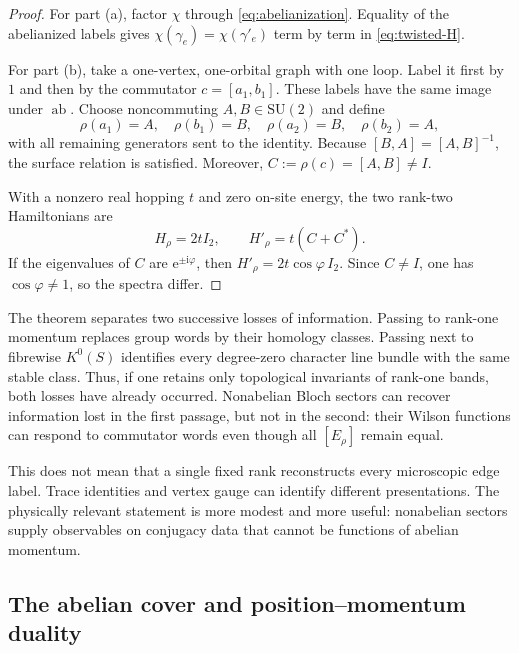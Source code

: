 \documentclass[11pt]{article}
\theoremstyle{definition}
\theoremstyle{remark}
\newcommand{\SU}{\mathrm{SU}}
\newcommand{\ii}{\mathrm i}
\newcommand{\e}{\mathrm e}
\begin{document}
\begin{proof}
For part \textup{(a)}, factor \(\chi\) through
\eqref{eq:abelianization}.  Equality of the abelianized labels gives
\(\chi(\gamma_e)=\chi(\gamma'_e)\) term by term in
\eqref{eq:twisted-H}.

For part \textup{(b)}, take a one-vertex, one-orbital graph with one loop.
Label it first by \(1\) and then by the commutator
\(c=[a_1,b_1]\).  These labels have the same image under
\(\operatorname{ab}\).  Choose noncommuting \(A,B\in\SU(2)\) and define
\[
 \rho(a_1)=A,\quad \rho(b_1)=B,\quad
 \rho(a_2)=B,\quad \rho(b_2)=A,
 \tag{4.18}\label{eq:commutator-representation}
\]
with all remaining generators sent to the identity.  Because
\([B,A]=[A,B]^{-1}\), the surface relation is satisfied.  Moreover,
\(C:=\rho(c)=[A,B]\neq I\).

With a nonzero real hopping \(t\) and zero on-site energy, the two rank-two
Hamiltonians are
\[
             H_\rho=2tI_2,\qquad
             H'_\rho=t(C+C^*).
             \tag{4.19}\label{eq:commutator-loop-H}
\]
If the eigenvalues of \(C\) are \(\e^{\pm\ii\varphi}\), then
\(H'_\rho=2t\cos\varphi\,I_2\).  Since \(C\neq I\), one has
\(\cos\varphi\neq1\), so the spectra differ.
\end{proof}

The theorem separates two successive losses of information.  Passing to
rank-one momentum replaces group words by their homology classes.  Passing
next to fibrewise \(K^0(S)\) identifies every degree-zero character line bundle
with the same stable class.  Thus, if one retains only topological invariants
of rank-one bands, both losses have already occurred.  Nonabelian Bloch
sectors can recover information lost in the first passage, but not in the
second: their Wilson functions can respond to
commutator words even though all \([E_\rho]\) remain equal.

This does not mean that a single fixed rank reconstructs every microscopic
edge label.  Trace identities and vertex gauge can identify different
presentations.  The physically relevant statement is more modest and more
useful: nonabelian sectors supply observables on conjugacy data that cannot be
functions of abelian momentum.

\subsection{The abelian cover and position--momentum duality}
\end{document}
